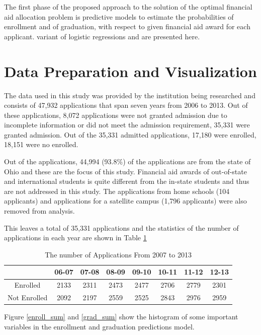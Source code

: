 \documentclass[12pt,english]{report}
\begin{document}
The first phase of the proposed approach to the solution of the optimal
financial aid allocation problem is predictive models to estimate the
probabilities of enrollment and of graduation, with respect to given financial
aid award for each applicant. %
variant of logistic regressions and are presented here.

\section{Data Preparation and Visualization}
The data used in this study was provided by the institution being researched
and consists of 47,932 applications that span seven years from 2006 to 2013.
Out of these applications, 8,072 applications were not granted admission due to
incomplete information or did not meet the admission requirement, 35,331 were
granted admission. Out of the 35,331 admitted applications, 17,180 were
enrolled, 18,151 were no enrolled.

Out of the applications, 44,994 (93.8\%) of the applications are from the state
of Ohio and these are the focus of this study. Financial aid awards of
out-of-state and international students is quite different from the in-state
students and thus are not addressed in this study. The applications from home
schools (104 applicants) and applications for a satellite campus (1,796
applicants) were also removed from analysis.

This leaves a total of 35,331 applications and the statistics of the number of
applications in each year are shown in Table \ref{enroll_year_sum}
\begin{table}[ht]
\centering
\begin{tabular}{|c|c|c|c|c|c|c|c|}
\hline
          & 06-07 & 07-08 & 08-09 & 09-10 & 10-11 & 11-12 & 12-13 \\ \hline
Enrolled  & 2133  & 2311  & 2473  & 2477  & 2706  & 2779  & 2301  \\
\hline
Not Enrolled   & 2092  & 2197  & 2559  & 2525  & 2843  & 2976  & 2959
\\ \hline
\end{tabular}
\caption{The number of Applications From 2007 to 2013}
\label{enroll_year_sum}
\end{table}




Figure \ref{enroll_sum} and \ref{grad_sum} show the histogram of some 
important variables in the enrollment and graduation predictions model.
\end{document}
